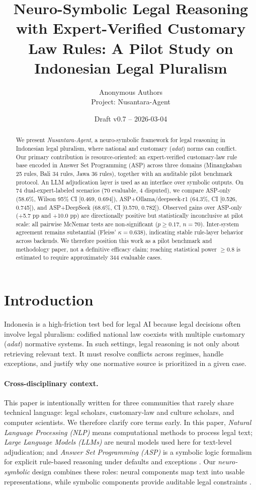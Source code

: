 \documentclass[11pt]{article}
\title{Neuro-Symbolic Legal Reasoning with Expert-Verified Customary Law Rules: A Pilot Study on Indonesian Legal Pluralism}
\author{
Anonymous Authors\\
Project: Nusantara-Agent
}
\date{Draft v0.7 -- 2026-03-04}
\begin{document}
\maketitle

\begin{abstract}
We present \textit{Nusantara-Agent}, a neuro-symbolic framework for legal reasoning in Indonesian legal pluralism, where national and customary (\textit{adat}) norms can conflict.
Our primary contribution is resource-oriented: an expert-verified customary-law rule base encoded in Answer Set Programming (ASP) across three domains (Minangkabau 25 rules, Bali 34 rules, Jawa 36 rules), together with an auditable pilot benchmark protocol.
An LLM adjudication layer is used as an interface over symbolic outputs.
On 74 dual-expert-labeled scenarios (70 evaluable, 4 disputed), we compare ASP-only (58.6\%, Wilson 95\% CI [0.469, 0.694]), ASP+Ollama/deepseek-r1 (64.3\%, CI [0.526, 0.745]), and ASP+DeepSeek (68.6\%, CI [0.570, 0.782]).
Observed gains over ASP-only (+5.7 pp and +10.0 pp) are directionally positive but statistically inconclusive at pilot scale: all pairwise McNemar tests are non-significant ($p \geq 0.17$, $n=70$).
Inter-system agreement remains substantial (Fleiss' $\kappa = 0.638$), indicating stable rule-layer behavior across backends.
We therefore position this work as a pilot benchmark and methodology paper, not a definitive efficacy claim; reaching statistical power $\geq$0.8 is estimated to require approximately 344 evaluable cases.
\end{abstract}

\section{Introduction}

Indonesia is a high-friction test bed for legal AI because legal decisions often involve legal pluralism: codified national law coexists with multiple customary (\textit{adat}) normative systems. In such settings, legal reasoning is not only about retrieving relevant text. It must resolve conflicts across regimes, handle exceptions, and justify why one normative source is prioritized in a given case.

\paragraph{Cross-disciplinary context.}
This paper is intentionally written for three communities that rarely share technical language: legal scholars, customary-law and culture scholars, and computer scientists. We therefore clarify core terms early. In this paper, \textit{Natural Language Processing (NLP)} means computational methods to process legal text; \textit{Large Language Models (LLMs)} are neural models used here for text-level adjudication; and \textit{Answer Set Programming (ASP)} is a symbolic logic formalism for explicit rule-based reasoning under defaults and exceptions \cite{lifschitz2019asp,gebser2014clingo}. Our \textit{neuro-symbolic} design combines these roles: neural components map text into usable representations, while symbolic components provide auditable legal constraints \cite{garcez2023neurosymbolic}.
\end{document}
